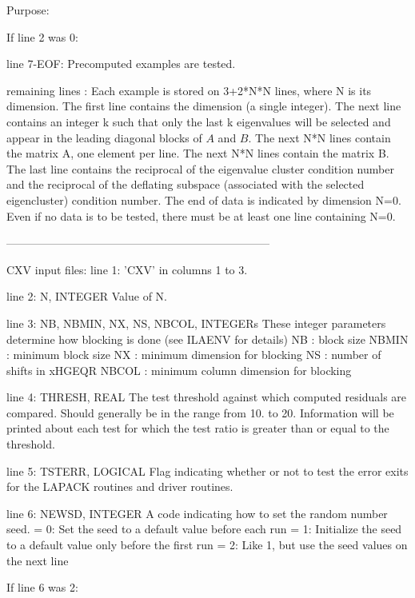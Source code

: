 \begin{DoxyParagraph}{Purpose\+: }
\begin{DoxyVerb}
 If line 2 was 0:

 line 7-EOF: Precomputed examples are tested.

 remaining lines : Each example is stored on 3+2*N*N lines, where N is
          its dimension. The first line contains the dimension (a
          single integer).  The next line contains an integer k such
          that only the last k eigenvalues will be selected and appear
          in the leading diagonal blocks of $A$ and $B$. The next N*N
          lines contain the matrix A, one element per line. The next N*N
          lines contain the matrix B. The last line contains the
          reciprocal of the eigenvalue cluster condition number and the
          reciprocal of the deflating subspace (associated with the
          selected eigencluster) condition number.  The end of data is
          indicated by dimension N=0.  Even if no data is to be tested,
          there must be at least one line containing N=0.

-----------------------------------------------------------------------

 CXV input files:
 line 1:  'CXV' in columns 1 to 3.

 line 2:  N, INTEGER
          Value of N.

 line 3:  NB, NBMIN, NX, NS, NBCOL, INTEGERs
          These integer parameters determine how blocking is done
          (see ILAENV for details)
          NB     : block size
          NBMIN  : minimum block size
          NX     : minimum dimension for blocking
          NS     : number of shifts in xHGEQR
          NBCOL  : minimum column dimension for blocking

 line 4:  THRESH, REAL
          The test threshold against which computed residuals are
          compared. Should generally be in the range from 10. to 20.
          Information will be printed about each test for which the
          test ratio is greater than or equal to the threshold.

 line 5:  TSTERR, LOGICAL
          Flag indicating whether or not to test the error exits for
          the LAPACK routines and driver routines.

 line 6:  NEWSD, INTEGER
          A code indicating how to set the random number seed.
          = 0:  Set the seed to a default value before each run
          = 1:  Initialize the seed to a default value only before the
                first run
          = 2:  Like 1, but use the seed values on the next line

 If line 6 was 2:


\end{DoxyVerb}
\end{DoxyParagraph}
